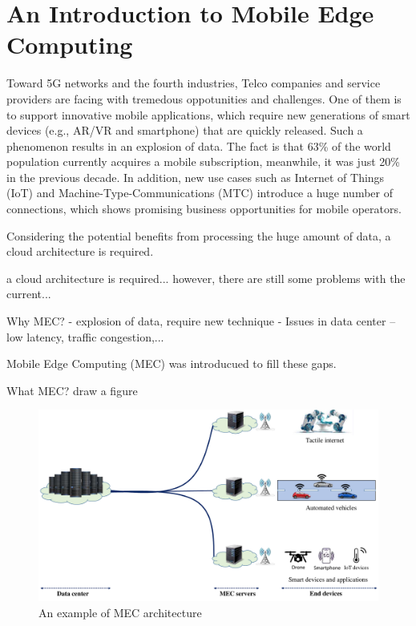 \section{An Introduction to Mobile Edge Computing}  \label{intro}


Toward 5G networks and the fourth industries, Telco companies and service providers are facing with tremedous oppotunities and challenges. One of them is to support innovative mobile applications, which require new generations of smart devices (e.g., AR/VR and smartphone) that are quickly released. Such a phenomenon results in an explosion of data. The fact is that 63\% of the world population currently acquires a mobile subscription, meanwhile, it was just 20\% in the previous decade. In addition, new use cases such as Internet of Things (IoT) and Machine-Type-Communications (MTC) introduce a huge number of connections, which shows promising business opportunities for mobile operators.

Considering the potential benefits from processing the huge amount of data, a cloud architecture is required.

a cloud architecture is required... however, there are still some problems with the current...


Why MEC? 
  - explosion of data, require new technique
  - Issues in data center -- low latency, traffic congestion,...

Mobile Edge Computing (MEC) was introducued to fill these gaps.

What MEC? draw a figure


\begin{figure}[H]
  \begin{center}
   \includegraphics[width=13cm]{./figures/mec-arch.pdf}
   \caption{An example of MEC architecture}
   \label{fig:mec-arch}
   \end{center}
\end{figure}
